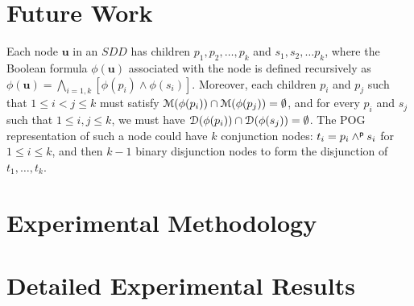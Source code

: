 \documentclass[letterpaper,USenglish,cleveref, autoref, thm-restate]{lipics-v2021}
\newcommand{\pand}{\mathbin{\land^{\sf p}}}
\newcommand{\dependencyset}{{\cal D}}
\newcommand{\modelset}{{\cal M}}
\newcommand{\makenode}[1]{\mathbf{#1}}
\newcommand{\nodeu}{\makenode{u}}
\begin{document}
\section{Future Work}
\label{sect:future}


Each node $\nodeu$ in an $SDD$ has children $p_1, p_2, \ldots, p_k$ and
$s_1, s_2, \ldots p_k$, where the Boolean formula $\phi(\nodeu)$ associated
with the node is defined recursively as $\phi(\nodeu) = \bigwedge_{i=1,k}
[\phi(p_i) \land \phi(s_i)]$.  Moreover, each children $p_i$ and $p_j$
such that $1 \leq i < j \leq k$ must satisfy $\modelset(\phi(p_i))
\cap \modelset(\phi(p_j)) = \emptyset$, and for every $p_i$ and $s_j$
such that $1 \leq i,j \leq k$, we must have $\dependencyset(\phi(p_i))
\cap \dependencyset(\phi(s_j)) = \emptyset$.  The POG representation
of such a node could have $k$ conjunction nodes: $t_i = p_i \pand s_i$
for $1 \leq i \leq k$, and then $k-1$ binary disjunction nodes to form
the disjunction of $t_1, \ldots, t_k$.




\appendix

\section{Experimental Methodology}

\section{Detailed Experimental Results}
\end{document}
